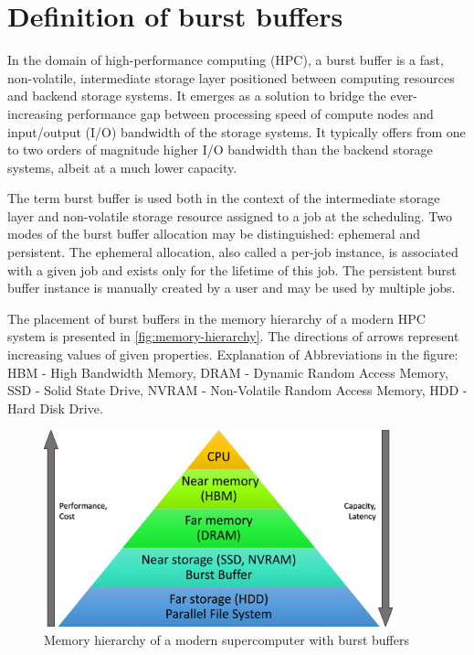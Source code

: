 \documentclass[thesis-en.tex]{subfiles}
\begin{document}
\section{Definition of burst buffers}
In the domain of high-performance computing (HPC), a burst buffer is a fast, non-volatile, intermediate storage layer positioned between computing resources and backend storage systems. It emerges as a solution to bridge the ever-increasing performance gap between processing speed of compute nodes and input/output (I/O) bandwidth of the storage systems. It typically offers from one to two orders of magnitude higher I/O bandwidth than the backend storage systems, albeit at a much lower capacity.

The term burst buffer is used both in the context of the intermediate storage layer and non-volatile storage resource assigned to a job at the scheduling. Two modes of the burst buffer allocation may be distinguished: ephemeral and persistent. The ephemeral allocation, also called a per-job instance, is associated with a given job and exists only for the lifetime of this job. The persistent burst buffer instance is manually created by a user and may be used by multiple jobs.

The placement of burst buffers in the memory hierarchy of a modern HPC system is presented in \autoref{fig:memory-hierarchy}. The directions of arrows represent increasing values of given properties. Explanation of Abbreviations in the figure: HBM - High Bandwidth Memory, DRAM - Dynamic Random Access Memory, SSD - Solid State Drive, NVRAM - Non-Volatile Random Access Memory, HDD - Hard Disk Drive.

\begin{figure}[htb]
    \centering
    \includegraphics[width=0.9\textwidth]{images/Memory-hierarchy.pdf}
    \caption{Memory hierarchy of a modern supercomputer with burst buffers}
    \label{fig:memory-hierarchy}
\end{figure}
\end{document}
